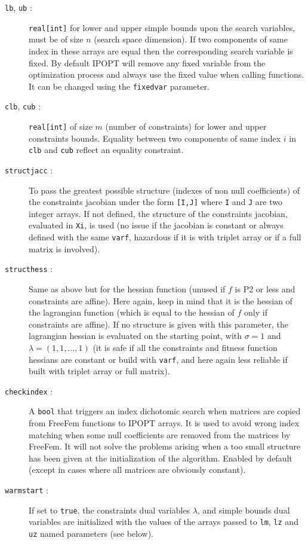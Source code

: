 \documentclass[a4paper,twoside,12pt]{book}
\begin{document}
\begin{description}
  \item[\texttt{lb}, \texttt{ub} :] {\tt real[int]} for lower and upper simple bounds upon the search variables, must be of size $n$ (search space dimension). If two components of same index in these arrays are equal then the corresponding search variable is fixed. By default IPOPT will remove any fixed variable from the optimization process and always use the fixed value when calling functions. It can be changed using the {\tt fixedvar} parameter.
  \item[\texttt{clb}, \texttt{cub} :] {\tt real[int]} of size $m$ (number of constraints) for lower and upper constraints bounds. Equality between two components of same index $i$ in {\tt clb} and {\tt cub} reflect an equality constraint.
  \item[\texttt{structjacc} :] To pass the greatest possible structure (indexes of non null coefficients) of the constraints jacobian under the form {\tt [I,J]} where {\tt I} and {\tt J} are two integer arrays. If not defined, the structure of the constraints jacobian, evaluated in {\tt Xi}, is used (no issue if the jacobian is constant or always defined with the same {\tt varf}, hazardous if it is with triplet array or if a full matrix is involved).
  \item[\texttt{structhess} :] Same as above but for the hessian function (unused if $f$ is P2 or less and constraints are affine). Here again, keep in mind that it is the hessian of the lagrangian function (which is equal to the hessian of $f$ only if constraints are affine). If no structure is given with this parameter, the lagrangian hessian is evaluated on the starting point, with $\sigma=1$ and $\lambda = (1,1,\dots,1)$ (it is safe if all the constraints and fitness function hessians are constant or build with {\tt varf}, and here again less reliable if built with triplet array or full matrix).
  \item[\texttt{checkindex} :] A {\tt bool} that triggers an index dichotomic search when matrices are copied from FreeFem functions to IPOPT arrays.  It is used to avoid wrong index matching when some null coefficients are removed from the matrices by FreeFem. It will not solve the problems arising when a too small structure has been given at the initialization of the algorithm. Enabled by default (except in cases where all matrices are obviously constant).
  \item[\texttt{warmstart} :] If set to {\tt true}, the constraints dual variables $\lambda$, and simple bounds dual variables are initialized with the values of the arrays passed to {\tt lm}, {\tt lz} and {\tt uz} named parameters (see below).

\end{description}
\end{document}

